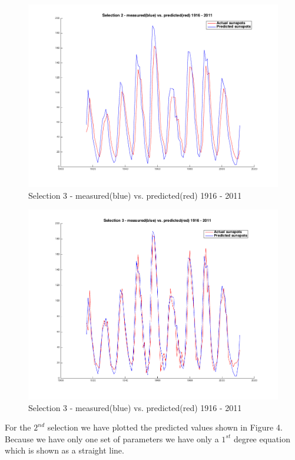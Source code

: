 \documentclass{article}      %
\begin{document}
\begin{figure}[ht]
\centering
\includegraphics[scale=.4]{img/pred2}
\caption{Selection 3 - measured(blue) vs. predicted(red) 1916 - 2011 \label{overflow}}
\end{figure}

\begin{figure}[ht]
\centering
\includegraphics[scale=.4]{img/pred3}
\caption{Selection 3 - measured(blue) vs. predicted(red) 1916 - 2011 \label{overflow}}
\end{figure}

For the $2^{nd}$ selection we have plotted the predicted values shown in Figure 4. Because we have only one set of parameters we have only a $1^{st}$ degree equation which is shown as a straight line. \\
\end{document}

